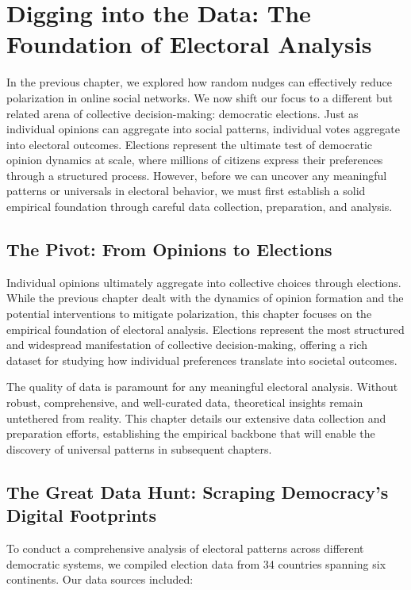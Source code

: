 \chapter{Digging into the Data: The Foundation of Electoral Analysis}
\label{chap3}

In the previous chapter, we explored how random nudges can effectively reduce polarization in online social networks. We now shift our focus to a different but related arena of collective decision-making: democratic elections. Just as individual opinions can aggregate into social patterns, individual votes aggregate into electoral outcomes. Elections represent the ultimate test of democratic opinion dynamics at scale, where millions of citizens express their preferences through a structured process. However, before we can uncover any meaningful patterns or universals in electoral behavior, we must first establish a solid empirical foundation through careful data collection, preparation, and analysis.

\section{The Pivot: From Opinions to Elections}

Individual opinions ultimately aggregate into collective choices through elections. While the previous chapter dealt with the dynamics of opinion formation and the potential interventions to mitigate polarization, this chapter focuses on the empirical foundation of electoral analysis. Elections represent the most structured and widespread manifestation of collective decision-making, offering a rich dataset for studying how individual preferences translate into societal outcomes.

The quality of data is paramount for any meaningful electoral analysis. Without robust, comprehensive, and well-curated data, theoretical insights remain untethered from reality. This chapter details our extensive data collection and preparation efforts, establishing the empirical backbone that will enable the discovery of universal patterns in subsequent chapters.

\section{The Great Data Hunt: Scraping Democracy's Digital Footprints}

To conduct a comprehensive analysis of electoral patterns across different democratic systems, we compiled election data from 34 countries spanning six continents. Our data sources included:

